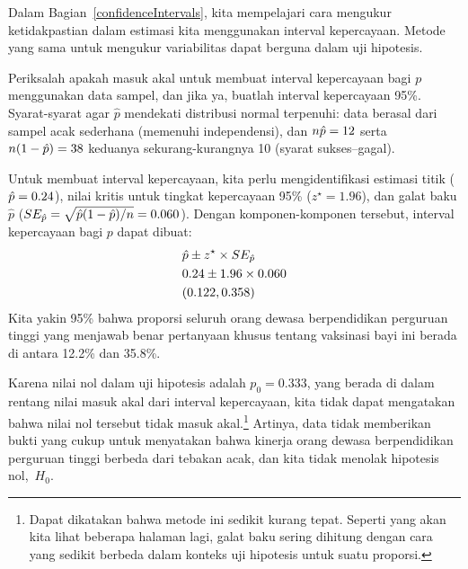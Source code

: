 Dalam Bagian~\ref{confidenceIntervals}, kita mempelajari cara
mengukur ketidakpastian dalam estimasi kita menggunakan interval
kepercayaan. 
Metode yang sama untuk mengukur variabilitas dapat berguna
dalam uji hipotesis.

\begin{examplewrap}
\begin{nexample}{Periksalah apakah masuk akal untuk membuat
    interval kepercayaan bagi $p$ menggunakan data sampel, dan
    jika ya, buatlah interval kepercayaan 95\%.}
  Syarat-syarat agar $\hat{p}$ mendekati distribusi normal
  terpenuhi: data berasal dari sampel acak sederhana (memenuhi
  independensi), dan $n\hat{p} = 12$ serta
  $n(1 - \hat{p}) = 38$ keduanya
  sekurang-kurangnya 10 (syarat sukses--gagal).

  Untuk membuat interval kepercayaan, kita perlu mengidentifikasi
  estimasi titik ($\hat{p} = 0.24$),
  nilai kritis untuk
  tingkat kepercayaan 95\% ($z^{\star} = 1.96$), dan galat
  baku $\hat{p}$
  ($SE_{\hat{p}} = \sqrt{\hat{p}(1 - \hat{p}) / n} = 0.060$).
  Dengan komponen-komponen tersebut, interval kepercayaan bagi $p$ dapat
  dibuat:
  \begin{align*}
    &\hat{p} \pm z^{\star} \times SE_{\hat{p}} \\
    &0.24 \pm 1.96 \times 0.060 \\
    &(0.122, 0.358)
  \end{align*}
  Kita yakin 95\% bahwa proporsi seluruh
  orang dewasa berpendidikan perguruan tinggi yang menjawab benar
  pertanyaan khusus tentang vaksinasi bayi ini berada di antara
  12.2\% dan 35.8\%.
\end{nexample}
\end{examplewrap}

Karena nilai nol dalam uji hipotesis adalah $p_0 = 0.333$,
yang berada di dalam rentang nilai masuk akal dari
interval kepercayaan, kita tidak dapat mengatakan bahwa nilai nol tersebut
tidak masuk akal.\footnote{Dapat dikatakan bahwa metode ini sedikit kurang tepat.
  Seperti yang akan kita lihat beberapa halaman lagi, galat baku sering
  dihitung dengan cara yang sedikit berbeda dalam konteks uji hipotesis
  untuk suatu proporsi.}
Artinya, data tidak memberikan bukti yang cukup untuk menyatakan
bahwa kinerja orang dewasa berpendidikan
perguruan tinggi berbeda dari tebakan acak,
dan kita tidak menolak hipotesis nol,~$H_0$.

